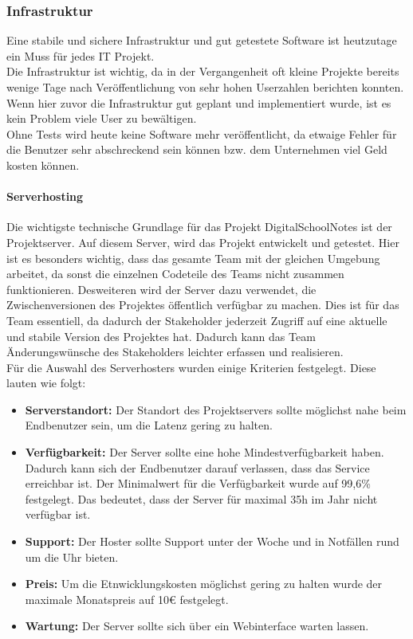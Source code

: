 
\subsubsection{Infrastruktur}
Eine stabile und sichere Infrastruktur und gut getestete Software ist heutzutage ein Muss für jedes IT Projekt. \\
Die Infrastruktur ist wichtig, da in der Vergangenheit oft kleine Projekte bereits wenige Tage nach Veröffentlichung von sehr hohen Userzahlen berichten konnten. Wenn hier zuvor die Infrastruktur gut geplant und implementiert wurde, ist es kein Problem viele User zu bewältigen.\\ 
Ohne Tests wird heute keine Software mehr veröffentlicht, da etwaige Fehler für die Benutzer sehr abschreckend sein können bzw. dem Unternehmen viel Geld kosten können.
\paragraph{Serverhosting}
Die wichtigste technische Grundlage für das Projekt DigitalSchoolNotes ist der Projektserver. Auf diesem Server, wird das Projekt entwickelt und getestet. Hier ist es besonders wichtig, dass das gesamte Team mit der gleichen Umgebung arbeitet, da sonst die einzelnen Codeteile des Teams nicht zusammen funktionieren. Desweiteren wird der Server dazu verwendet, die Zwischenversionen des Projektes öffentlich verfügbar zu machen. Dies ist für das Team essentiell, da dadurch der \gls{Stakeholder} jederzeit Zugriff auf eine aktuelle und stabile Version des Projektes hat. Dadurch kann das Team Änderungswünsche des Stakeholders leichter erfassen und realisieren.\\

Für die Auswahl des Serverhosters wurden einige Kriterien festgelegt. Diese lauten wie folgt:
\begin{itemize}
\item \textbf{Serverstandort:} Der Standort des Projektservers sollte möglichst nahe beim Endbenutzer sein, um die \gls{Latenz} gering zu halten.
\item \textbf{Verfügbarkeit:} Der Server sollte eine hohe Mindestverfügbarkeit haben. Dadurch kann sich der Endbenutzer darauf verlassen, dass das Service erreichbar ist. Der Minimalwert für die Verfügbarkeit wurde auf 99,6\% festgelegt. Das bedeutet, dass der Server für maximal 35h im Jahr nicht verfügbar ist.
\item \textbf{Support:} Der Hoster sollte Support unter der Woche und in Notfällen rund um die Uhr bieten.
\item \textbf{Preis:} Um die Etnwicklungskosten möglichst gering zu halten wurde der maximale Monatspreis auf 10€ festgelegt.
\item \textbf{Wartung:} Der Server sollte sich über ein Webinterface warten lassen.
\end{itemize}

